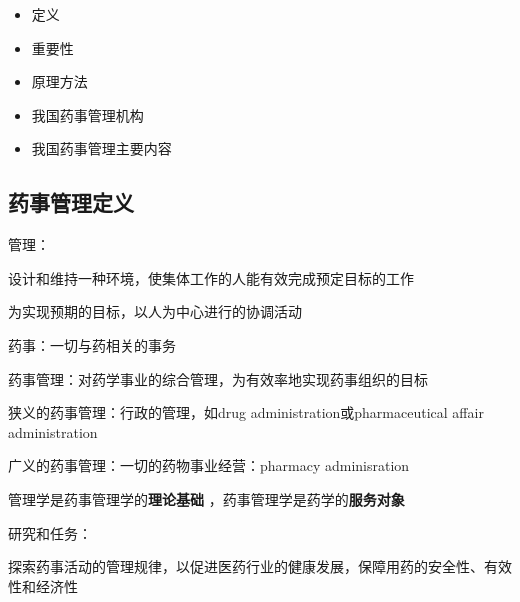 \begin{itemize}
    \item 定义
    \item 重要性
    \item 原理方法
    \item 我国药事管理机构
    \item 我国药事管理主要内容
\end{itemize}
\subsection{药事管理定义}%
\label{sub:药事管理定义}
\begin{defi}
    管理：

    设计和维持一种环境，使集体工作的人能有效完成预定目标的工作

    为实现预期的目标，以人为中心进行的协调活动
\end{defi}
\begin{defi}
    药事：一切与药相关的事务

    药事管理：对药学事业的综合管理，为有效率地实现药事组织的目标
\end{defi}
\begin{notation}
    狭义的药事管理：行政的管理，如drug administration或pharmaceutical affair administration

    广义的药事管理：一切的药物事业经营：pharmacy adminisration
\end{notation}
管理学是药事管理学的\textbf{理论基础} ，药事管理学是药学的\textbf{服务对象} 
\begin{notation}
    研究和任务：

    探索药事活动的管理规律，以促进医药行业的健康发展，保障用药的安全性、有效性和经济性
\end{notation}
